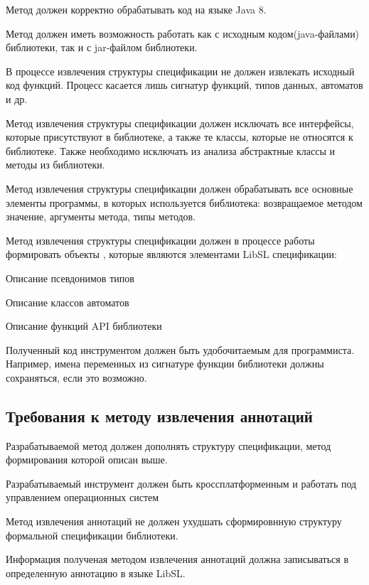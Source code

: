 Метод должен корректно обрабатывать код на языке Java 8.

Метод должен иметь возможность работать как с исходным кодом(java-файлами) библиотеки, так и с jar-файлом библиотеки.

В процессе извлечения структуры спецификации не должен извлекать исходный код функций. Процесс касается лишь сигнатур функций, типов данных, автоматов и др.

Метод извлечения структуры спецификации должен исключать все интерфейсы, которые присутствуют в библиотеке, а также те классы, которые не относятся к библиотеке.
Также необходимо исключать из анализа абстрактные классы и методы из библиотеки.

Метод извлечения структуры спецификации должен обрабатывать все основные элементы программы, в которых используется библиотека: возвращаемое методом значение, аргументы метода, типы методов.

Метод извлечения структуры спецификации должен в процессе работы формировать объекты , которые являются элементами LibSL спецификации:
%
\begin{itemize*}
\item Описание псевдонимов типов
\item Описание классов автоматов
\item Описание функций API библиотеки
\end{itemize*}
%

Полученный код инструментом должен быть удобочитаемым для программиста. Например, имена переменных из сигнатуре функции библиотеки должны сохраняться, если это возможно.

\subsection{Требования к методу извлечения аннотаций}

Разрабатываемой метод должен дополнять структуру спецификации, метод формирования которой описан выше.

Разрабатываемый инструмент должен быть кроссплатформенным и работать под управлением операционных систем

Метод извлечения аннотаций не должен ухудшать сформировнную структуру формальной спецификации библиотеки.

Информация полученая методом извлечения аннотаций должна записываться в определенную аннотацию в языке LibSL.

